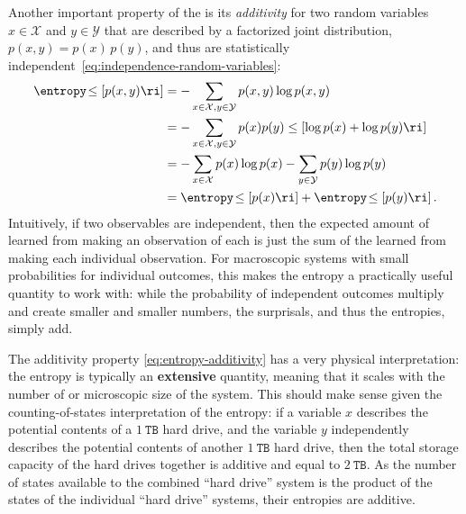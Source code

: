 Another important property of the  is its  \emph{additivity} for two random variables $x \in \mathcal{X}$ and $y \in \mathcal{Y}$ that are described by a factorized joint distribution, $p(x,y)=p(x)\,p(y)$, and thus are statistically independent~\eqref{eq:independence-random-variables}:
\begin{align}
\entropy\!\le[p(x,y)\ri] &= - \sum_{x \in \mathcal{X}, y \in \mathcal{Y}} p(x, y) \log p(x, y) \notag \\
&=  - \sum_{x \in \mathcal{X}, y \in \mathcal{Y}} p(x) p(y) \le[ \log p(x) + \log p(y)\ri] \notag \\
&= - \sum_{x \in \mathcal{X}} p(x) \log p(x) - \sum_{y \in \mathcal{Y}} p(y) \log p(y) \notag \\
&= \entropy\!\le[p(x)\ri] +\entropy\!\le[p(y)\ri] \, .
\label{eq:entropy-additivity}
\end{align}
Intuitively, if two observables are independent, then the expected amount of  learned from making an observation of each is just the sum of the  learned from making each individual observation.
For macroscopic systems with small probabilities for individual outcomes, this makes the entropy a practically useful quantity to work with: while the probability of independent outcomes multiply and create smaller and smaller numbers, the surprisals, and thus the entropies, simply add.

The additivity property \eqref{eq:entropy-additivity} has a very physical interpretation: the entropy is typically an \textbf{extensive} quantity, meaning that it scales with the number of  or microscopic size of the system.
This should make sense given the counting-of-states interpretation of the entropy: if a variable $x$ describes the potential contents of a $1~\texttt{TB}$ hard drive, and the variable $y$ independently describes the potential contents of another $1~\texttt{TB}$ hard drive, then the total storage capacity of the hard drives together is additive and equal to $2~\texttt{TB}$. As the number of states available to the combined ``hard drive'' system is the product of the states of the individual ``hard drive'' systems, their entropies are additive.

